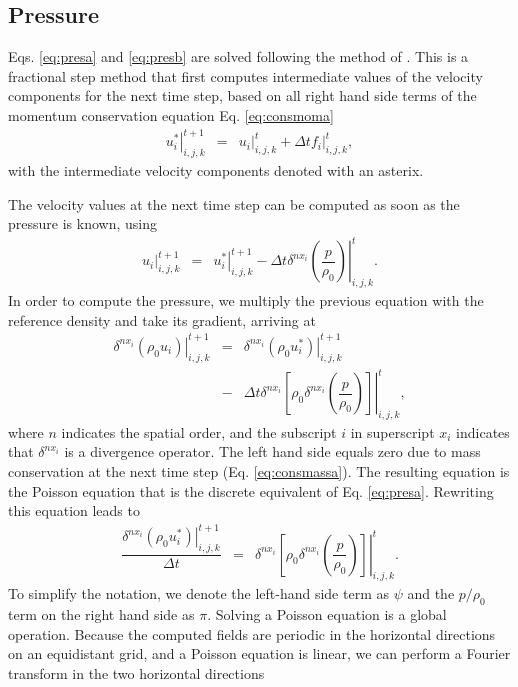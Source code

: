 \documentclass[gmd,manuscript]{copernicus}
\begin{document}
\subsection{Pressure}
Eqs. \ref{eq:presa} and \ref{eq:presb} are solved following the method of \citet{Chorin1968}. This is a fractional step method that first computes intermediate values of the velocity components for the next time step, based on all right hand side terms of the momentum conservation equation Eq. \ref{eq:consmoma}
\begin{eqnarray}
\left. u_i^* \right|^{t+1}_{i,j,k} & = & \left. u_i \right|^{t}_{i,j,k} + \Delta t \left. f_i \right|^{t}_{i,j,k},
\end{eqnarray}
with the intermediate velocity components denoted with an asterix.

The velocity values at the next time step can be computed as soon as the pressure is known, using
\begin{eqnarray}
\left. u_i\right|^{t+1}_{i,j,k} & = & \left. u_i^* \right|^{t+1}_{i,j,k} - \Delta t \left. \delta^{nx_i}\left( \dfrac{p}{\rho_0}\right)\right|^t_{i,j,k}.
\end{eqnarray}
In order to compute the pressure, we multiply the previous equation with the reference density and take its gradient, arriving at
\begin{eqnarray}
\nonumber \left. \delta^{nx_i} \left( \rho_0 u_i\right) \right|^{t+1}_{i,j,k} & = & 
\left. \delta^{nx_i} \left( \rho_0 u_i^* \right) \right|^{t+1}_{i,j,k}\\
& - &  \Delta t \left.\delta^{nx_i} \left[ \rho_0 \delta^{nx_i}\left( \dfrac{p}{\rho_0}\right) \right] \right|^t_{i,j,k},
\end{eqnarray}
where $n$ indicates the spatial order, and the subscript $i$ in superscript $x_i$ indicates that $\delta^{nx_i}$ is a divergence operator. The left hand side equals zero due to mass conservation at the next time step (Eq. \ref{eq:consmassa}). The resulting equation is the Poisson equation that is the discrete equivalent of Eq. \ref{eq:presa}. Rewriting this equation leads to
\begin{eqnarray}
\dfrac{\left. \delta^{nx_i} \left( \rho_0 u_i^* \right) \right|^{t+1}_{i,j,k}}{\Delta t}
& = &  \left. \delta^{nx_i} \left[ \rho_0 \delta^{nx_i}\left( \dfrac{p}{\rho_0}\right) \right] \right|^t_{i,j,k}.
\end{eqnarray}
To simplify the notation, we denote the left-hand side term as $\psi$ and the $p / \rho_0$ term on the right hand side as $\pi$. Solving a Poisson equation is a global operation. Because the computed fields are periodic in the horizontal directions on an equidistant grid, and a Poisson equation is linear, we can perform a Fourier transform in the two horizontal directions
\end{document}
